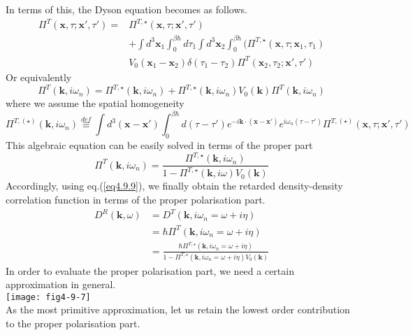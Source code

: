  In terms of this, the Dyson equation becomes as follows.
\begin{equation}
\begin{aligned}
\Pi^{T}(\mathbf x,\tau;\mathbf x',\tau')=&\Pi^{T,\star}(\mathbf x,\tau;\mathbf x',\tau')\\
&+\int d^3\mathbf x_1 \int_0^{\beta\hbar}d\tau_1\int d^3\mathbf x_2\int _0^{\beta\hbar}(\Pi^{T,\star}(\mathbf x,\tau;\mathbf x_1,\tau_1)\\
&V_0(\mathbf x_1-\mathbf x_2)\delta(\tau_1-\tau_2)\Pi^T(\mathbf x_2,\tau_2;\mathbf x',\tau')
\end{aligned}
\end{equation}
 Or equivalently
\begin{equation}
\Pi^T(\mathbf k,i\omega_n)=\Pi^{T,\star}(\mathbf k,i\omega_n)+\Pi^{T,\star}(\mathbf k,i\omega_n)V_0(\mathbf k)\Pi^T(\mathbf k,i\omega_n)
\end{equation}
 where we assume the spatial homogeneity
\begin{equation}
\Pi^{T,(\star)}(\mathbf k,i\omega_n)\overset{def}{\equiv}\int d^3(\mathbf x-\mathbf x')\int_0^{\beta\hbar} d(\tau-\tau') e^{-i\mathbf k\cdot(\mathbf x-\mathbf x')} e^{i\omega_n(\tau-\tau')} \Pi^{T,(\star)}(\mathbf x,\tau;\mathbf x',\tau')
\end{equation}
 This algebraic equation can be easily solved in terms of the proper part
\begin{equation}
\Pi^T(\mathbf k,i\omega_n)=\frac{\Pi^{T,\star}(\mathbf k,i\omega_n)}{1-\Pi^{T,\star}(\mathbf k,i\omega)V_0(\mathbf k)}
\end{equation}
 Accordingly, using eq.(\ref{eq4.9.9}), we finally obtain the retarded density-density correlation function in terms of the proper polarisation part.
\begin{equation}
\begin{aligned}
D^R(\mathbf k,\omega)&=D^T(\mathbf k,i\omega_n=\omega+i\eta)\\
&=\hbar \Pi^T(\mathbf k,i\omega_n=\omega+i\eta)\\
&=\frac{\hbar \Pi^{T,\star}(\mathbf k,i\omega_n=\omega+i\eta)}{1-\Pi^{T,\star}(\mathbf k,i\omega_n=\omega+i\eta)V_0(\mathbf k)}
\end{aligned}
\end{equation}
In order to evaluate the proper polarisation part, we need a certain approximation in general.\\
\texttt{[image: fig4-9-7]}\\
As the most primitive approximation, let us retain the lowest order contribution to the proper polarisation part.
